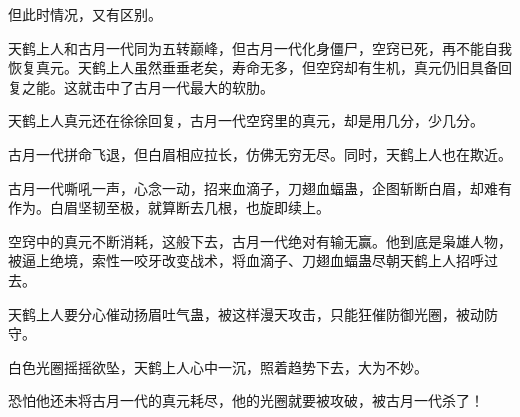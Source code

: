 \begin{this_body}
但此时情况，又有区别。

天鹤上人和古月一代同为五转巅峰，但古月一代化身僵尸，空窍已死，再不能自我恢复真元。天鹤上人虽然垂垂老矣，寿命无多，但空窍却有生机，真元仍旧具备回复之能。这就击中了古月一代最大的软肋。

天鹤上人真元还在徐徐回复，古月一代空窍里的真元，却是用几分，少几分。

古月一代拼命飞退，但白眉相应拉长，仿佛无穷无尽。同时，天鹤上人也在欺近。

古月一代嘶吼一声，心念一动，招来血滴子，刀翅血蝠蛊，企图斩断白眉，却难有作为。白眉坚韧至极，就算断去几根，也旋即续上。

空窍中的真元不断消耗，这般下去，古月一代绝对有输无赢。他到底是枭雄人物，被逼上绝境，索性一咬牙改变战术，将血滴子、刀翅血蝠蛊尽朝天鹤上人招呼过去。

天鹤上人要分心催动扬眉吐气蛊，被这样漫天攻击，只能狂催防御光圈，被动防守。

白色光圈摇摇欲坠，天鹤上人心中一沉，照着趋势下去，大为不妙。

恐怕他还未将古月一代的真元耗尽，他的光圈就要被攻破，被古月一代杀了！

\end{this_body}

